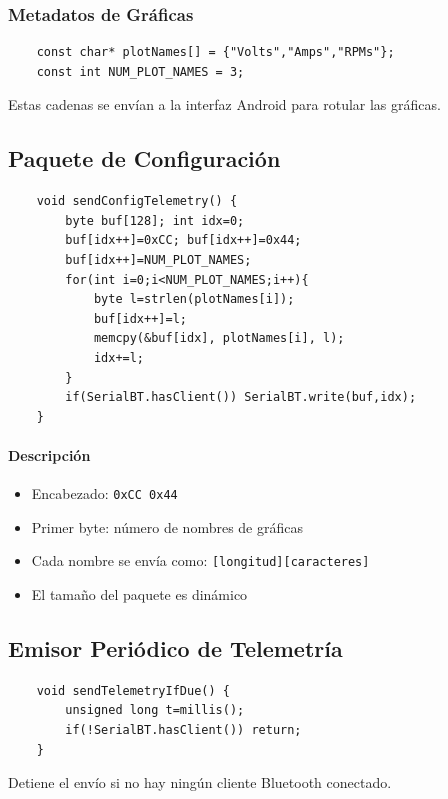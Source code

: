 \documentclass[12pt,a4paper]{article}
\begin{document}
\subsubsection{Metadatos de Gráficas}

\begin{lstlisting}
	const char* plotNames[] = {"Volts","Amps","RPMs"};
	const int NUM_PLOT_NAMES = 3;
\end{lstlisting}

Estas cadenas se envían a la interfaz Android para rotular las gráficas.

\subsection{Paquete de Configuración}

\begin{lstlisting}
	void sendConfigTelemetry() {
		byte buf[128]; int idx=0;
		buf[idx++]=0xCC; buf[idx++]=0x44;
		buf[idx++]=NUM_PLOT_NAMES;
		for(int i=0;i<NUM_PLOT_NAMES;i++){
			byte l=strlen(plotNames[i]);
			buf[idx++]=l;
			memcpy(&buf[idx], plotNames[i], l);
			idx+=l;
		}
		if(SerialBT.hasClient()) SerialBT.write(buf,idx);
	}
\end{lstlisting}

\paragraph{Descripción}

\begin{itemize}
	\item Encabezado: \texttt{0xCC 0x44}
	\item Primer byte: número de nombres de gráficas
	\item Cada nombre se envía como: \texttt{[longitud][caracteres]}
	\item El tamaño del paquete es dinámico
\end{itemize}

\subsection{Emisor Periódico de Telemetría}

\begin{lstlisting}
	void sendTelemetryIfDue() {
		unsigned long t=millis();
		if(!SerialBT.hasClient()) return;
	}
\end{lstlisting}

Detiene el envío si no hay ningún cliente Bluetooth conectado.
\end{document}
